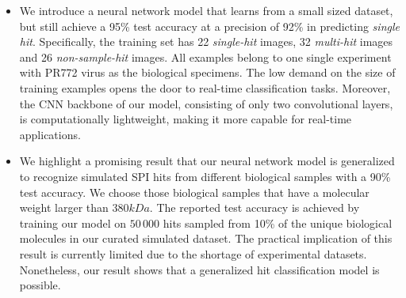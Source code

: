 \begin{itemize}

    \item We introduce a neural network model that learns from a small sized
    dataset, but still achieve a 95\% test accuracy at a precision of 92\% in
    predicting \textit{single hit}. Specifically, the training set has 22
    \textit{single-hit} images, 32 \textit{multi-hit} images and 26
    \textit{non-sample-hit} images.  All examples belong to one single
    experiment with PR772 virus as the biological specimens.  The low demand on
    the size of training examples opens the door to real-time classification
    tasks.  Moreover, the CNN backbone of our model, consisting of only two
    convolutional layers, is computationally lightweight, making it more capable
    for real-time applications.  

    \item We highlight a promising result that our neural network model is
    generalized to recognize simulated SPI hits from different biological
    samples with a 90\% test accuracy.  We choose those biological samples that
    have a molecular weight larger than $380 kDa$.  The reported test accuracy
    is achieved by training our model on $50\,000$ hits sampled from 10\% of the
    unique biological molecules in our curated simulated dataset.  The practical
    implication of this result is currently limited due to the shortage of
    experimental datasets.  Nonetheless, our result shows that a generalized hit
    classification model is possible.


\end{itemize}
